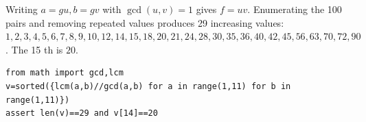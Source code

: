 Writing $a=gu,b=gv$ with $\gcd(u,v)=1$ gives $f=uv$. Enumerating the 100 pairs and removing repeated values produces 29 increasing values: $1,2,3,4,5,6,7,8,9,10,12,14,15,18,20,21,24,28,30,35,36,40,42,45,56,63,70,72,90$. The 15 th is $\boxed{20}$.
\begin{verbatim}
from math import gcd,lcm
v=sorted({lcm(a,b)//gcd(a,b) for a in range(1,11) for b in range(1,11)})
assert len(v)==29 and v[14]==20
\end{verbatim}
